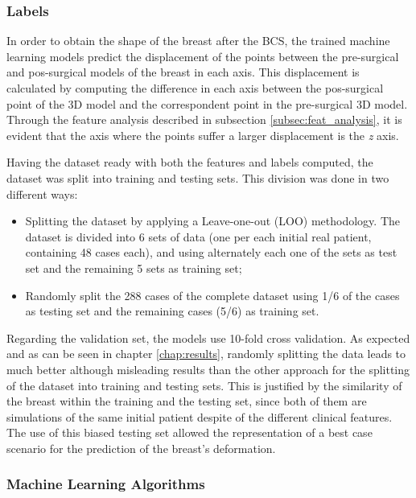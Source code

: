 \subsubsection{Labels} \label{subsec:labels}

In order to obtain the shape of the breast after the BCS, the trained machine learning models predict the displacement of the points between the pre-surgical and pos-surgical models of the breast in each axis. This displacement is calculated by computing the difference in each axis between the pos-surgical point of the 3D model and the correspondent point in the pre-surgical 3D model. Through the feature analysis described in subsection \ref{subsec:feat_analysis}, it is evident that the axis where the points suffer a larger displacement is the \textit{z} axis.

\vspace{12mm}

Having the dataset ready with both the features and labels computed, the dataset was split into training and testing sets. This division was done in two different ways:
\begin{itemize}
\item Splitting the dataset by applying a Leave-one-out (LOO) methodology. The dataset is divided into 6 sets of data (one per each initial real patient, containing 48 cases each), and using alternately each one of the sets as test set and the remaining 5 sets as training set;
\item Randomly split the 288 cases of the complete dataset using 1/6 of the cases as testing set and the remaining cases (5/6) as training set.
\end{itemize}

Regarding the validation set, the models use 10-fold cross validation. As expected and as can be seen in chapter \ref{chap:results}, randomly splitting the data leads to much better although misleading results than the other approach for the splitting of the dataset into training and testing sets. This is justified by the similarity of the breast within the training and the testing set, since both of them are simulations of the same initial patient despite of the different clinical features. The use of this biased testing set allowed the representation of a best case scenario for the prediction of the breast's deformation.

\subsubsection{Machine Learning Algorithms} \label{subsec:implementation}

